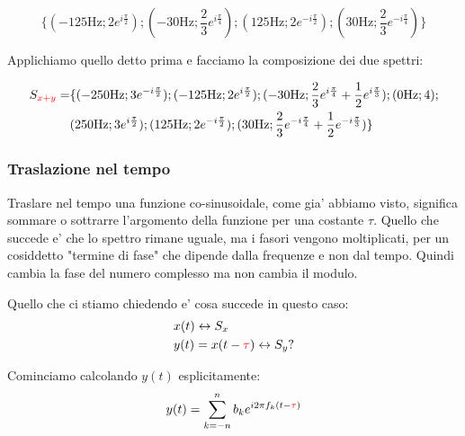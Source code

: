 \begin{equation}
    \{ (-125 \mbox{Hz}; 2e^{i\frac{\pi}{2}}); (-30 \mbox{Hz}; \frac{2}{3}e^{i\frac{\pi}{4}}); (125 \mbox{Hz}; 2e^{-i\frac{\pi}{2}}); (30 \mbox{Hz}; \frac{2}{3}e^{-i\frac{\pi}{4}}) \}
\end{equation}

Applichiamo quello detto prima e facciamo la composizione dei due spettri:

\begin{equation}\begin{split}
    S_{\textcolor{red}{x + y}} =  &\{ (-250 \mbox{Hz}; 3e^{-i\frac{\pi}{2}}); (-125 \mbox{Hz}; 2e^{i\frac{\pi}{2}}); (-30 \mbox{Hz}; \frac{2}{3}e^{i\frac{\pi}{4}} + \frac{1}{2}e^{i\frac{\pi}{3}}); (0 \mbox{Hz}; 4); \\
     &(250 \mbox{Hz}; 3e^{i\frac{\pi}{2}}); (125 \mbox{Hz}; 2e^{-i\frac{\pi}{2}}); (30 \mbox{Hz}; \frac{2}{3}e^{-i\frac{\pi}{4}} + \frac{1}{2}e^{-i\frac{\pi}{3}}) \}
\end{split}\end{equation}


\subsubsection{Traslazione nel tempo}
Traslare nel tempo una funzione co-sinusoidale, come gia' abbiamo visto, significa sommare o sottrarre l'argomento della funzione per una costante $\tau$. 
Quello che succede e' che lo spettro rimane uguale, ma i fasori vengono moltiplicati, per un cosiddetto "termine di fase" che dipende dalla frequenze e non dal tempo.  Quindi cambia la fase del numero complesso ma non cambia il modulo.

Quello che ci stiamo chiedendo e' cosa succede in questo caso:
\begin{equation}\begin{split}
    &x(t) \leftrightarrow S_x \\
    &y(t) = x(t - \textcolor{red}{\tau}) \leftrightarrow S_y \mbox{?}
\end{split}\end{equation}

Cominciamo calcolando $y(t)$ esplicitamente:
\begin{equation}\begin{split}
     y(t) &=  \sum_{k = -n}^{n} b_k e^{i 2 \pi f_k (t - \textcolor{red}{\tau})} \\
\end{split}\end{equation}

